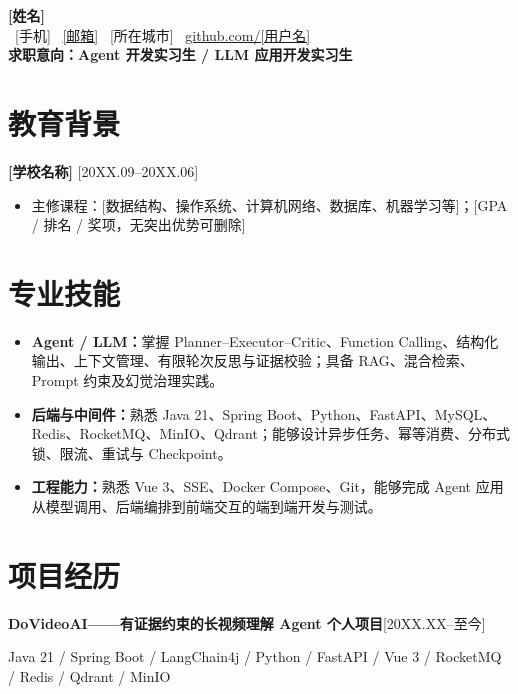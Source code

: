 \documentclass[10.5pt,a4paper]{ctexart}
\newcommand{\skill}[1]{\textbf{#1}}
\newcommand{\entry}[2]{\textbf{#1}\hfill\textcolor{muted}{#2}}
\begin{document}
\begin{center}
    {\LARGE\bfseries [姓名]}\\[4pt]
    \small
    \faPhone\ [手机]\quad
    \faEnvelope\ \href{mailto:yourname@example.com}{[邮箱]}\quad
    \faMapMarker*\ [所在城市]\quad
    \faGithub\ \href{https://github.com/[用户名]}{github.com/[用户名]}\\[3pt]
    \textbf{求职意向：Agent 开发实习生 / LLM 应用开发实习生}
\end{center}

\section{教育背景}
\entry{[学校名称] \quad [专业] \quad [本科/硕士]}{[20XX.09--20XX.06]}
\begin{itemize}
    \item 主修课程：[数据结构、操作系统、计算机网络、数据库、机器学习等]；[GPA / 排名 / 奖项，无突出优势可删除]
\end{itemize}

\section{专业技能}
\begin{itemize}
    \item \skill{Agent / LLM：}掌握 Planner--Executor--Critic、Function Calling、结构化输出、上下文管理、有限轮次反思与证据校验；具备 RAG、混合检索、Prompt 约束及幻觉治理实践。
    \item \skill{后端与中间件：}熟悉 Java 21、Spring Boot、Python、FastAPI、MySQL、Redis、RocketMQ、MinIO、Qdrant；能够设计异步任务、幂等消费、分布式锁、限流、重试与 Checkpoint。
    \item \skill{工程能力：}熟悉 Vue 3、SSE、Docker Compose、Git，能够完成 Agent 应用从模型调用、后端编排到前端交互的端到端开发与测试。
\end{itemize}

\section{项目经历}
\entry{DoVideoAI——有证据约束的长视频理解 Agent \quad 个人项目}{[20XX.XX--至今]}
\vspace{2pt}

\textcolor{muted}{\small Java 21 / Spring Boot / LangChain4j / Python / FastAPI / Vue 3 / RocketMQ / Redis / Qdrant / MinIO}
\end{document}
